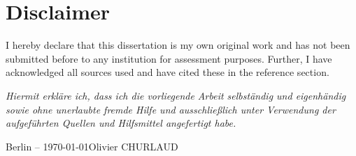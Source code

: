 
\chapter*{Disclaimer}

\vfill

I hereby declare that this dissertation is my own original work and has not been submitted 
before to any institution for assessment purposes.  Further, I have acknowledged all sources used and have cited these in the reference section. 

\vspace{1cm}

\noindent \textit{Hiermit erkläre ich, dass ich die vorliegende Arbeit selbständig und eigenhändig sowie ohne unerlaubte fremde Hilfe und ausschließlich unter Verwendung der aufgeführten Quellen und Hilfsmittel angefertigt habe.}

\vspace{3cm}

\noindent  Berlin -- \today \hfill Olivier CHURLAUD 

\vfill